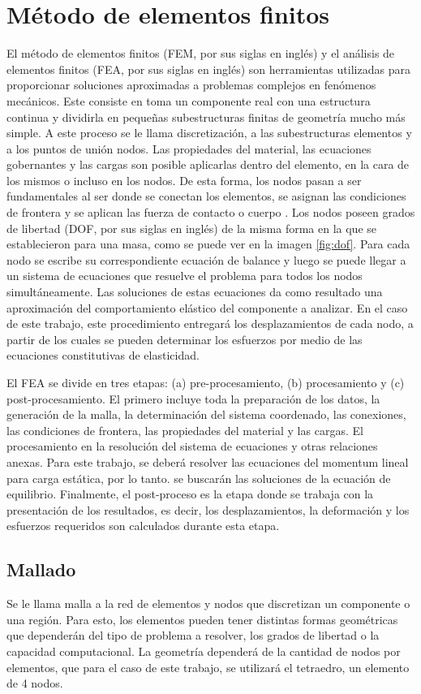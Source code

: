 \section{Método de elementos finitos}
El método de elementos finitos (FEM, por sus siglas en inglés) y el análisis de elementos finitos (FEA, por sus siglas en inglés) son herramientas utilizadas para proporcionar soluciones aproximadas a problemas complejos en fenómenos mecánicos. Este consiste en toma un componente real con una estructura continua y dividirla en pequeñas subestructuras finitas de geometría mucho más simple. A este proceso se le llama  discretización, a las subestructuras elementos y a los puntos de unión nodos. Las propiedades del material, las ecuaciones gobernantes y las cargas son posible aplicarlas dentro del elemento, en la cara de los mismos o incluso en los nodos. De esta forma, los nodos pasan a ser fundamentales al ser donde se conectan los elementos, se asignan las condiciones de frontera y se aplican las fuerza de contacto o cuerpo \cite{budynas2008shigley}. Los nodos poseen grados de libertad (DOF, por sus siglas en inglés) de la misma forma en la que se establecieron para una masa, como se puede ver en la imagen \ref{fig:dof}. Para cada nodo se escribe su correspondiente ecuación de balance y luego se puede llegar a un sistema de ecuaciones que resuelve el problema para todos los nodos simultáneamente. Las soluciones de estas ecuaciones da como resultado una aproximación del comportamiento elástico del componente a analizar. En el caso de este trabajo, este procedimiento entregará los desplazamientos de cada nodo, a partir de los cuales se pueden determinar los esfuerzos por medio de las ecuaciones constitutivas de elasticidad.

El FEA se divide en tres etapas: (a) pre-procesamiento, (b) procesamiento y (c) post-procesamiento. El primero incluye toda la preparación de los datos, la generación de la malla, la determinación del sistema coordenado, las conexiones, las condiciones de frontera, las propiedades del material y las cargas. El procesamiento en la resolución del sistema de ecuaciones y otras relaciones anexas. Para este trabajo, se deberá resolver las ecuaciones del momentum lineal para carga estática, por lo tanto. se buscarán las soluciones de la ecuación de equilibrio.  Finalmente, el post-proceso es la etapa donde se trabaja con la presentación de los resultados, es decir, los desplazamientos, la deformación y los esfuerzos requeridos son calculados durante esta etapa. 

\subsection{Mallado}
Se le llama malla a la red de elementos y nodos que discretizan un componente o una región. Para esto, los elementos pueden tener distintas formas geométricas que dependerán del tipo de problema a resolver, los grados de libertad o la capacidad computacional. La geometría dependerá de la cantidad de nodos por elementos, que para el caso de este trabajo, se utilizará el tetraedro, un elemento de 4 nodos.

